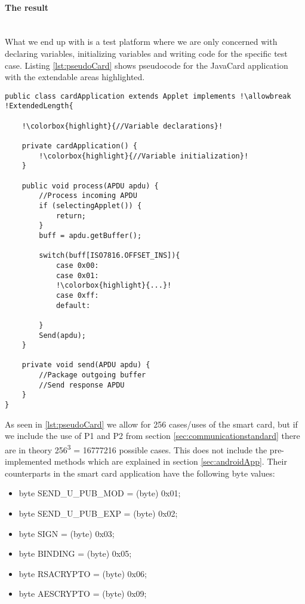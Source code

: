 \paragraph{The result}\mbox{}\\
What we end up with is a test platform where we are only concerned with declaring variables, initializing variables and writing code for the specific test case. Listing \ref{lst:pseudoCard} shows pseudocode for the JavaCard application with the extendable areas highlighted.


\begin{lstlisting}[caption=Pseudo code for javacard test application., label=lst:pseudoCard,escapechar=!]
public class cardApplication extends Applet implements !\allowbreak !ExtendedLength{

    !\colorbox{highlight}{//Variable declarations}!

    private cardApplication() {
    	!\colorbox{highlight}{//Variable initialization}!
    }

    public void process(APDU apdu) {
    	//Process incoming APDU
        if (selectingApplet()) {
			return;
		}
        buff = apdu.getBuffer();

    	switch(buff[ISO7816.OFFSET_INS]){
            case 0x00:
            case 0x01:
            !\colorbox{highlight}{...}!
            case 0xff:
            default:

    	}
    	Send(apdu);
    }

    private void send(APDU apdu) {
    	//Package outgoing buffer
    	//Send response APDU
    }
}
\end{lstlisting}

As seen in \ref{lst:pseudoCard} we allow for 256 cases/uses of the smart card, but if we include the use of P1 and P2 from section \ref{sec:communicationstandard} there are in theory 256\textsuperscript{3} = 16777216 possible cases. This does not include the pre-implemented methods which are explained in section \ref{sec:androidApp}. Their counterparts in the smart card application have the following byte values:

\begin{itemize}
    \item byte SEND\_U\_PUB\_MOD = (byte) 0x01;
    \item byte SEND\_U\_PUB\_EXP = (byte) 0x02;
    \item byte SIGN = (byte) 0x03;
    \item byte BINDING = (byte) 0x05;
    \item byte RSACRYPTO = (byte) 0x06;
    \item byte AESCRYPTO = (byte) 0x09;
\end{itemize}


